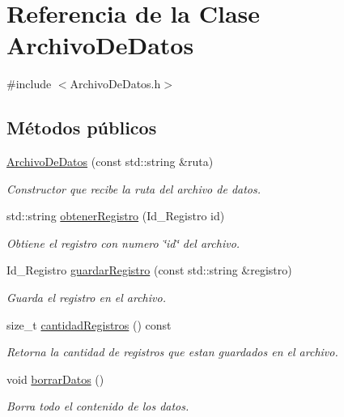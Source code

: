 \hypertarget{classArchivoDeDatos}{\section{\-Referencia de la \-Clase \-Archivo\-De\-Datos}
\label{classArchivoDeDatos}
}


{\ttfamily \#include $<$\-Archivo\-De\-Datos.\-h$>$}

\subsection*{\-Métodos públicos}
\begin{DoxyCompactItemize}
\item 
\hypertarget{classArchivoDeDatos_a7388ffa446c1c16388367bb7a485d791}{\hyperlink{classArchivoDeDatos_a7388ffa446c1c16388367bb7a485d791}{\-Archivo\-De\-Datos} (const std\-::string \&ruta)}\label{classArchivoDeDatos_a7388ffa446c1c16388367bb7a485d791}

\begin{DoxyCompactList}\small\item\em \-Constructor que recibe la ruta del archivo de datos. \end{DoxyCompactList}\item 
std\-::string \hyperlink{classArchivoDeDatos_acb8bffaaacd961744a0f450ab8e3924a}{obtener\-Registro} (\-Id\-\_\-\-Registro id)
\begin{DoxyCompactList}\small\item\em \-Obtiene el registro con numero \char`\"{}id\char`\"{} del archivo. \end{DoxyCompactList}\item 
\-Id\-\_\-\-Registro \hyperlink{classArchivoDeDatos_af678ef7076885d11cefb0a21f2239526}{guardar\-Registro} (const std\-::string \&registro)
\begin{DoxyCompactList}\small\item\em \-Guarda el registro en el archivo. \end{DoxyCompactList}\item 
size\-\_\-t \hyperlink{classArchivoDeDatos_a62e7765b4d6dc435fdf760ceb7a12cc4}{cantidad\-Registros} () const 
\begin{DoxyCompactList}\small\item\em \-Retorna la cantidad de registros que estan guardados en el archivo. \end{DoxyCompactList}\item 
\hypertarget{classArchivoDeDatos_a42079c29fd3c465a1ba83693795e7341}{void \hyperlink{classArchivoDeDatos_a42079c29fd3c465a1ba83693795e7341}{borrar\-Datos} ()}\label{classArchivoDeDatos_a42079c29fd3c465a1ba83693795e7341}

\begin{DoxyCompactList}\small\item\em \-Borra todo el contenido de los datos. \end{DoxyCompactList}\end{DoxyCompactItemize}


